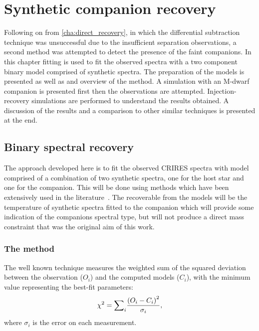 
\chapter{Synthetic companion recovery}  %
\label{cha:model_comparison}

Following on from \cref{cha:direct_recovery}, in which the differential subtraction technique was unsuccessful due to the insufficient separation observations, a second method was attempted to detect the presence of the faint companions. In this chapter \textchisquared fitting is used to fit the observed spectra with a two component binary model comprised of synthetic spectra. The preparation of the models is presented as well as and overview of the method. A simulation with an M-dwarf companion is presented first then the observations are attempted. Injection-recovery simulations are performed to understand the results obtained.
A discussion of the results and a comparison to other similar techniques is presented at the end.


\section{Binary \texorpdfstring{\textchisquared}\ spectral recovery}
\label{subsec:companion_recovery}
The approach developed here is to fit the observed CRIRES spectra with model comprised of a combination of two synthetic spectra, one for the host star and one for the companion. This will be done using \textchisquared{} methods which have been extensively used in the literature~\citep[e.g.][]{astudillo-defru_harps_2015, passegger_fundamental_2016, zechmeister_spectrum_2018, nemravova_xtauri_2016, kolbl_detection_2015}.
The recoverable from the models will be the temperature of synthetic spectra fitted to the companion which will provide some indication of the companions spectral type, but will not produce a direct mass constraint that was the original aim of this work.

\subsection{The \texorpdfstring{\textchisquared}\ method}
\label{subsec:chi2}
The well known \textchisquared{} technique measures the weighted sum of the squared deviation between the observation (\({O}_{i}\)) and the computed models (\(C_{i}\)), with the minimum \textchisquared{} value representing the best-fit parameters:
\[{\chi}^{2} = {\sum}_i \frac{{(O_{i} - C_{i})}^2}{{\sigma}_{i}},\] where \({\sigma}_{i}\) is the error on each measurement.


